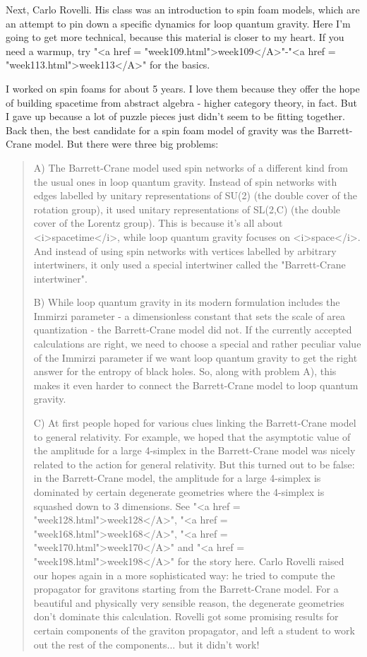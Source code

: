 Next, Carlo Rovelli.  His class was an introduction to spin foam
models, which are an attempt to pin down a specific dynamics for loop
quantum gravity.  Here I'm going to get more technical, because this
material is closer to my heart.  If you need a warmup, try
"<a href = "week109.html">week109</A>"-"<a href = "week113.html">week113</A>" for the basics.

I worked on spin foams for about 5 years.  I love them because they
offer the hope of building spacetime from abstract algebra - higher
category theory, in fact.  But I gave up because a lot of puzzle
pieces just didn't seem to be fitting together.  Back then, the best
candidate for a spin foam model of gravity was the Barrett-Crane
model.  But there were three big problems:

\begin{quote}
A) The Barrett-Crane model used spin networks of a different kind from
the usual ones in loop quantum gravity.  Instead of spin networks with
edges labelled by unitary representations of SU(2) (the double cover
of the rotation group), it used unitary representations of SL(2,C)
(the double cover of the Lorentz group).  This is because it's all
about <i>spacetime</i>, while loop quantum gravity focuses on
<i>space</i>.  And instead of using spin networks with vertices
labelled by arbitrary intertwiners, it only used a special intertwiner
called the "Barrett-Crane intertwiner".

B) While loop quantum gravity in its modern formulation includes the
Immirzi parameter - a dimensionless constant that sets the scale of
area quantization - the Barrett-Crane model did not.  If the currently
accepted calculations are right, we need to choose a special and
rather peculiar value of the Immirzi parameter if we want loop quantum
gravity to get the right answer for the entropy of black holes.  So,
along with problem A), this makes it even harder to connect the
Barrett-Crane model to loop quantum gravity.

C) At first people hoped for various clues linking the Barrett-Crane
model to general relativity.  For example, we hoped that the
asymptotic value of the amplitude for a large 4-simplex in the
Barrett-Crane model was nicely related to the action for general
relativity.  But this turned out to be false: in the Barrett-Crane
model, the amplitude for a large 4-simplex is dominated by certain
degenerate geometries where the 4-simplex is squashed down to 3
dimensions.  See "<a href = "week128.html">week128</A>",
"<a href = "week168.html">week168</A>", "<a href =
"week170.html">week170</A>" and "<a href =
"week198.html">week198</A>" for the story here.  Carlo Rovelli
raised our hopes again in a more sophisticated way: he tried to
compute the propagator for gravitons starting from the Barrett-Crane
model.  For a beautiful and physically very sensible reason, the
degenerate geometries don't dominate this calculation.  Rovelli got
some promising results for certain components of the graviton
propagator, and left a student to work out the rest of the
components... but it didn't work!
\end{quote}

